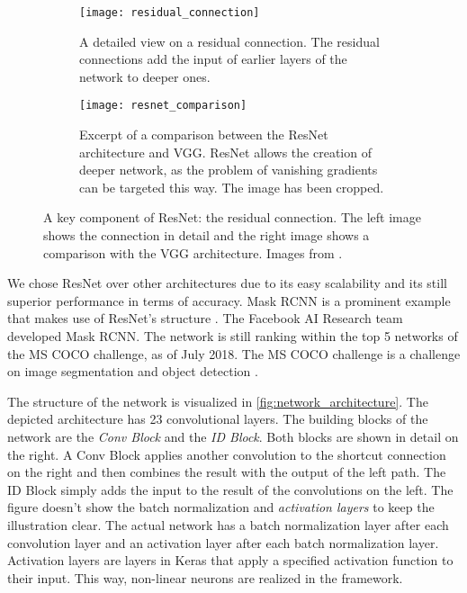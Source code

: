 \begin{figure}[!tbp]
	\centering
	\begin{subfigure}[t]{0.47\textwidth}
		\centering
    	\texttt{[image: residual\_connection]}
    	\caption{A detailed view on a residual connection. The residual connections add the input of earlier layers of the network to deeper ones.}
    	\label{fig:residual_connection}
	\end{subfigure}
	\hfill
	\begin{subfigure}[t]{0.47\textwidth}
		\centering
    	\texttt{[image: resnet\_comparison]}
    	\caption{Excerpt of a comparison between the ResNet architecture and VGG. ResNet allows the creation of deeper network, as the problem of vanishing gradients can be targeted this way. The image has been cropped.}
    	\label{fig:resnet_comparison}
	\end{subfigure}
	\caption{A key component of ResNet: the residual connection. The left image shows the connection in detail and the right image shows a comparison with the VGG architecture. Images from \cite{resnet}.}
	\label{fig:resnet_details}
\end{figure} 

We chose ResNet over other architectures due to its easy scalability and its still superior performance in terms of accuracy. Mask RCNN is a prominent example that makes use of ResNet's structure \cite{mask_rcnn}. The Facebook AI Research team developed Mask RCNN. The network is still ranking within the top 5 networks of the MS COCO challenge, as of July 2018. The MS COCO challenge is a challenge on image segmentation and object detection \cite{mscoco}.

The structure of the network is visualized in \fig \ref{fig:network_architecture}. The depicted architecture has 23 convolutional layers. The building blocks of the network are the \textit{Conv Block} and the \textit{ID Block}. Both blocks are shown in detail on the right. A Conv Block applies another convolution to the shortcut connection on the right and then combines the result with the output of the left path. The ID Block simply adds the input to the result of the convolutions on the left. The figure doesn't show the batch normalization and \textit{activation layers} to keep the illustration clear. The actual network has a batch normalization layer after each convolution layer and an activation layer after each batch normalization layer. Activation layers are layers in Keras that apply a specified activation function to their input. This way, non-linear neurons are realized in the framework.

